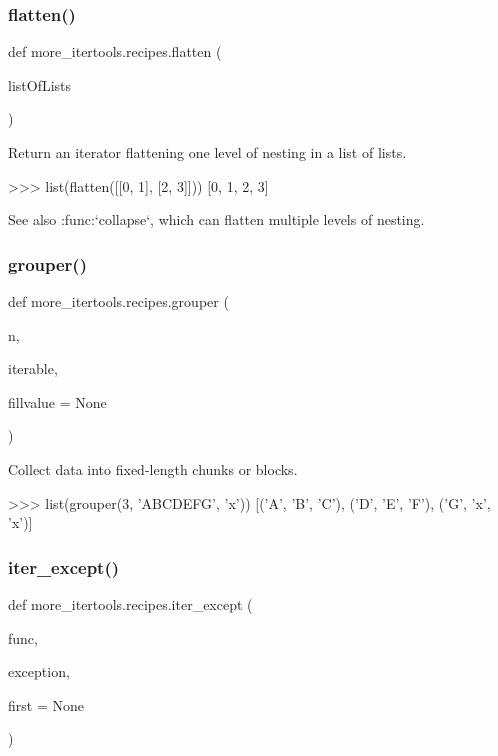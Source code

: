 \subsubsection{\texorpdfstring{flatten()}{flatten()}}
{\footnotesize\ttfamily def more\+\_\+itertools.\+recipes.\+flatten (\begin{DoxyParamCaption}\item[{}]{list\+Of\+Lists }\end{DoxyParamCaption})}

\begin{DoxyVerb}Return an iterator flattening one level of nesting in a list of lists.

    >>> list(flatten([[0, 1], [2, 3]]))
    [0, 1, 2, 3]

See also :func:`collapse`, which can flatten multiple levels of nesting.\end{DoxyVerb}
 \mbox{\label{namespacemore__itertools_1_1recipes_a654f713d06d41d740a2b2ac4c3a52fbd}} 
\subsubsection{\texorpdfstring{grouper()}{grouper()}}
{\footnotesize\ttfamily def more\+\_\+itertools.\+recipes.\+grouper (\begin{DoxyParamCaption}\item[{}]{n,  }\item[{}]{iterable,  }\item[{}]{fillvalue = {\ttfamily None} }\end{DoxyParamCaption})}

\begin{DoxyVerb}Collect data into fixed-length chunks or blocks.

    >>> list(grouper(3, 'ABCDEFG', 'x'))
    [('A', 'B', 'C'), ('D', 'E', 'F'), ('G', 'x', 'x')]\end{DoxyVerb}
 \mbox{\label{namespacemore__itertools_1_1recipes_a42d0a60e7c9143fbc96a4033462ad7d0}} 
\subsubsection{\texorpdfstring{iter\+\_\+except()}{iter\_except()}}
{\footnotesize\ttfamily def more\+\_\+itertools.\+recipes.\+iter\+\_\+except (\begin{DoxyParamCaption}\item[{}]{func,  }\item[{}]{exception,  }\item[{}]{first = {\ttfamily None} }\end{DoxyParamCaption})}

